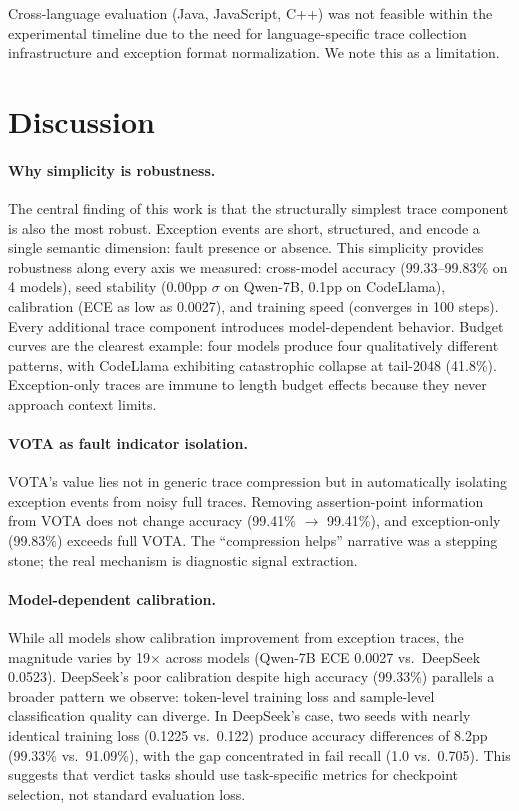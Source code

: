 \documentclass[11pt]{article}
\begin{document}
Cross-language evaluation (Java, JavaScript, C++) was not feasible within the experimental timeline due to the need for language-specific trace collection infrastructure and exception format normalization. We note this as a limitation.

\section{Discussion}
\label{sec:discussion}

\paragraph{Why simplicity is robustness.}
The central finding of this work is that the structurally simplest trace component is also the most robust. Exception events are short, structured, and encode a single semantic dimension: fault presence or absence. This simplicity provides robustness along every axis we measured: cross-model accuracy (99.33--99.83\% on 4 models), seed stability (0.00pp $\sigma$ on Qwen-7B, 0.1pp on CodeLlama), calibration (ECE as low as 0.0027), and training speed (converges in 100 steps). Every additional trace component introduces model-dependent behavior. Budget curves are the clearest example: four models produce four qualitatively different patterns, with CodeLlama exhibiting catastrophic collapse at tail-2048 (41.8\%). Exception-only traces are immune to length budget effects because they never approach context limits.

\paragraph{VOTA as fault indicator isolation.}
VOTA's value lies not in generic trace compression but in automatically isolating exception events from noisy full traces. Removing assertion-point information from VOTA does not change accuracy (99.41\% $\to$ 99.41\%), and exception-only (99.83\%) exceeds full VOTA. The ``compression helps'' narrative was a stepping stone; the real mechanism is diagnostic signal extraction.

\paragraph{Model-dependent calibration.}
While all models show calibration improvement from exception traces, the magnitude varies by 19$\times$ across models (Qwen-7B ECE 0.0027 vs.\ DeepSeek 0.0523). DeepSeek's poor calibration despite high accuracy (99.33\%) parallels a broader pattern we observe: token-level training loss and sample-level classification quality can diverge. In DeepSeek's case, two seeds with nearly identical training loss (0.1225 vs.\ 0.122) produce accuracy differences of 8.2pp (99.33\% vs.\ 91.09\%), with the gap concentrated in fail recall (1.0 vs.\ 0.705). This suggests that verdict tasks should use task-specific metrics for checkpoint selection, not standard evaluation loss.
\end{document}
